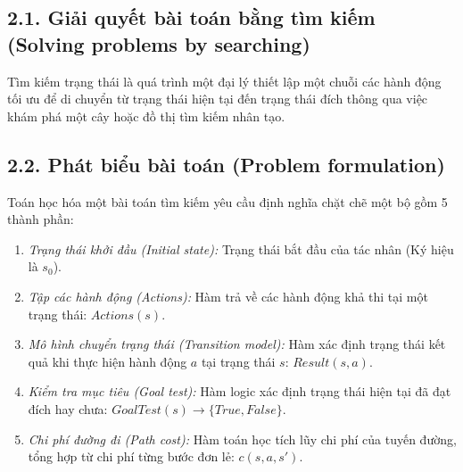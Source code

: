 \documentclass[11pt,a4paper]{article}
\begin{document}
\subsection{2.1. Giải quyết bài toán bằng tìm kiếm (Solving problems by searching)}
Tìm kiếm trạng thái là quá trình một đại lý thiết lập một chuỗi các hành động tối ưu để di chuyển từ trạng thái hiện tại đến trạng thái đích thông qua việc khám phá một cây hoặc đồ thị tìm kiếm nhân tạo.

\subsection{2.2. Phát biểu bài toán (Problem formulation)}
Toán học hóa một bài toán tìm kiếm yêu cầu định nghĩa chặt chẽ một bộ gồm 5 thành phần:
\begin{enumerate}
    \item \textit{Trạng thái khởi đầu (Initial state):} Trạng thái bắt đầu của tác nhân (Ký hiệu là $s_0$).
    \item \textit{Tập các hành động (Actions):} Hàm trả về các hành động khả thi tại một trạng thái: $Actions(s)$.
    \item \textit{Mô hình chuyển trạng thái (Transition model):} Hàm xác định trạng thái kết quả khi thực hiện hành động $a$ tại trạng thái $s$: $Result(s, a)$.
    \item \textit{Kiểm tra mục tiêu (Goal test):} Hàm logic xác định trạng thái hiện tại đã đạt đích hay chưa: $GoalTest(s) \rightarrow \{True, False\}$.
    \item \textit{Chi phí đường đi (Path cost):} Hàm toán học tích lũy chi phí của tuyến đường, tổng hợp từ chi phí từng bước đơn lẻ: $c(s, a, s')$.
\end{enumerate}
\end{document}
